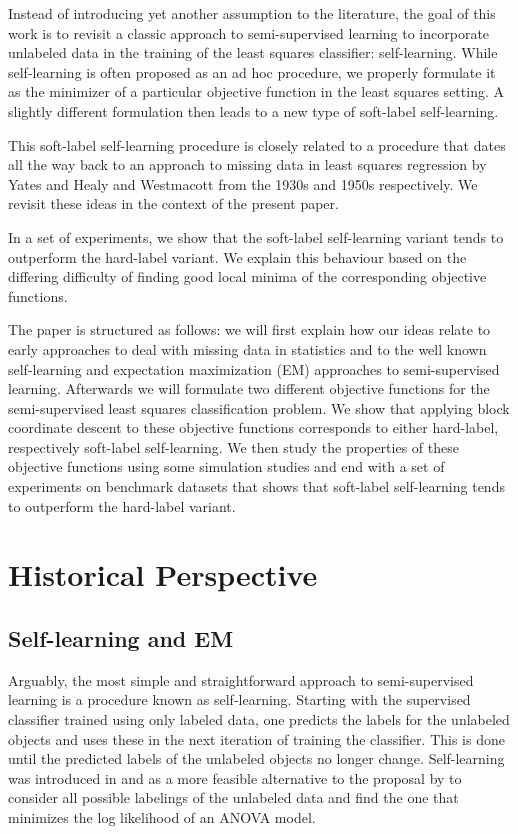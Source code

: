 \documentclass[conference,a4paper,10pt]{IEEEtran}\usepackage[]{graphicx}\usepackage[]{color}
\begin{document}
Instead of introducing yet another assumption to the literature, the goal of this work is to revisit a classic approach to semi-supervised learning to incorporate unlabeled data in the training of the least squares classifier: self-learning. While self-learning is often proposed as an ad hoc procedure, we properly formulate it as the minimizer of a particular objective function in the least squares setting. A slightly different formulation then leads to a new type of soft-label self-learning. 

This soft-label self-learning procedure is closely related to a procedure that dates all the way back to an approach to missing data in least squares regression by Yates \cite{Yates1933} and Healy and Westmacott \cite{Healy1956} from the 1930s and 1950s respectively. We revisit these ideas in the context of the present paper.

In a set of experiments, we show that the soft-label self-learning variant tends to outperform the hard-label variant. We explain this behaviour based on the differing difficulty of finding good local minima of the corresponding objective functions. 

The paper is structured as follows: we will first explain how our ideas relate to early approaches to deal with missing data in statistics and to the well known self-learning and expectation maximization (EM) approaches to semi-supervised learning. Afterwards we will formulate two different objective functions for the semi-supervised least squares classification problem. We show that applying block coordinate descent \cite[Ch. 2.7]{Bertsekas1999} to these objective functions corresponds to either hard-label, respectively soft-label self-learning. We then study the properties of these objective functions using some simulation studies and end with a set of experiments on benchmark datasets that shows that soft-label self-learning tends to outperform the hard-label variant.

\section{Historical Perspective}

\subsection{Self-learning and EM}
Arguably, the most simple and straightforward approach to semi-supervised learning is a procedure known as self-learning. Starting with the supervised classifier trained using only labeled data, one predicts the labels for the unlabeled objects and uses these in the next iteration of training the classifier. This is done until the predicted labels of the unlabeled objects no longer change. Self-learning was introduced in \cite{McLachlan1975} and \cite{McLachlan1977} as a more feasible alternative to the proposal by \cite{Hartley1968b} to consider all possible labelings of the unlabeled data and find the one that minimizes the log likelihood of an ANOVA model.
\end{document}
